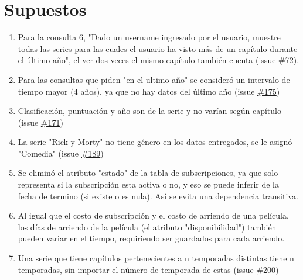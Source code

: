 \documentclass{article}
\begin{document}
\section{Supuestos}
\begin{enumerate}
    \item Para la consulta 6, "Dado un username ingresado por el usuario, muestre todas las series para las cuales el usuario ha visto más de un capítulo durante el último año", el ver dos veces el mismo capítulo también cuenta (issue \href{https://github.com/IIC2413/Syllabus-2023-2/issues/172}{\#72}).
    \item Para las consultas que piden "en el ultimo año" se consideró un intervalo de tiempo mayor (4 años), ya que no hay datos del último año (issue \href{https://github.com/IIC2413/Syllabus-2023-2/issues/175}{\#175})
    \item Clasificación, puntuación y año son de la serie y no varían según capítulo (issue \href{https://github.com/IIC2413/Syllabus-2023-2/issues/171}{\#171})
    \item La serie "Rick  y Morty" no tiene género en los datos entregados, se le asignó "Comedia" (issue \href{https://github.com/IIC2413/Syllabus-2023-2/issues/189}{\#189})
    \item Se eliminó el atributo "estado" de la tabla de subscripciones, ya que solo representa si la subscripción esta activa o no, y eso se puede inferir de la fecha de termino (si existe o es nula). Así se evita una dependencia transitiva.
    \item Al igual que el costo de subscripción y el costo de arriendo de una película, los días de arriendo de la película (el atributo "disponibilidad") también pueden variar en el tiempo, requiriendo ser guardados para cada arriendo.
    \item Una serie que tiene capítulos pertenecientes a n temporadas distintas tiene n temporadas, sin importar el número de temporada de estas (issue \href{https://github.com/IIC2413/Syllabus-2023-2/issues/200}{\#200})
\end{enumerate}
\end{document}
